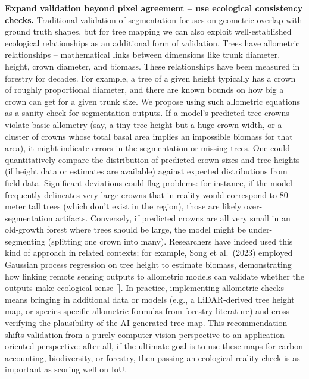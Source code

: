 \documentclass[runningheads]{llncs}
\begin{document}
\textbf{Expand validation beyond pixel agreement -- use ecological
consistency checks.} Traditional validation of segmentation focuses on
geometric overlap with ground truth shapes, but for tree mapping we can
also exploit well-established ecological relationships as an additional
form of validation. Trees have allometric relationships -- mathematical
links between dimensions like trunk diameter, height, crown diameter,
and biomass. These relationships have been measured in forestry for
decades. For example, a tree of a given height typically has a crown of
roughly proportional diameter, and there are known bounds on how big a
crown can get for a given trunk size. We propose using such allometric
equations as a sanity check for segmentation outputs. If a model's
predicted tree crowns violate basic allometry (say, a tiny tree height
but a huge crown width, or a cluster of crowns whose total basal area
implies an impossible biomass for that area), it might indicate errors
in the segmentation or missing trees. One could quantitatively compare
the distribution of predicted crown sizes and tree heights (if height
data or estimates are available) against expected distributions from
field data. Significant deviations could flag problems: for instance, if
the model frequently delineates very large crowns that in reality would
correspond to 80-meter tall trees (which don't exist in the region),
those are likely over-segmentation artifacts. Conversely, if predicted
crowns are all very small in an old-growth forest where trees should be
large, the model might be under-segmenting (splitting one crown into
many). Researchers have indeed used this kind of approach in related
contexts; for example, Song et al.~(2023) employed Gaussian process
regression on tree height to estimate biomass, demonstrating how linking
remote sensing outputs to allometric models can validate whether the
outputs make ecological sense {[}\cite{song2023biomass}{]}. In practice,
implementing allometric checks means bringing in additional data or
models (e.g., a LiDAR-derived tree height map, or species-specific
allometric formulas from forestry literature) and cross-verifying the
plausibility of the AI-generated tree map. This recommendation shifts
validation from a purely computer-vision perspective to an
application-oriented perspective: after all, if the ultimate goal is to
use these maps for carbon accounting, biodiversity, or forestry, then
passing an ecological reality check is as important as scoring well on
IoU.
\end{document}
